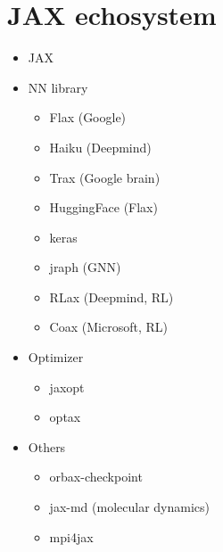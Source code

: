 \documentclass[11pt]{article}
\begin{document}
\section{JAX echosystem}
\label{sec:orgad0dd02}

\begin{itemize}
\item JAX
\item NN library
\begin{itemize}
\item Flax  (Google)
\item Haiku  (Deepmind)
\item Trax  (Google brain)
\item HuggingFace (Flax)
\item keras
\item jraph  (GNN)
\item RLax (Deepmind, RL)
\item Coax (Microsoft, RL)
\end{itemize}
\item Optimizer
\begin{itemize}
\item jaxopt
\item optax
\end{itemize}
\item Others
\begin{itemize}
\item orbax-checkpoint
\item jax-md  (molecular dynamics)
\item mpi4jax
\end{itemize}
\end{itemize}
\end{document}
